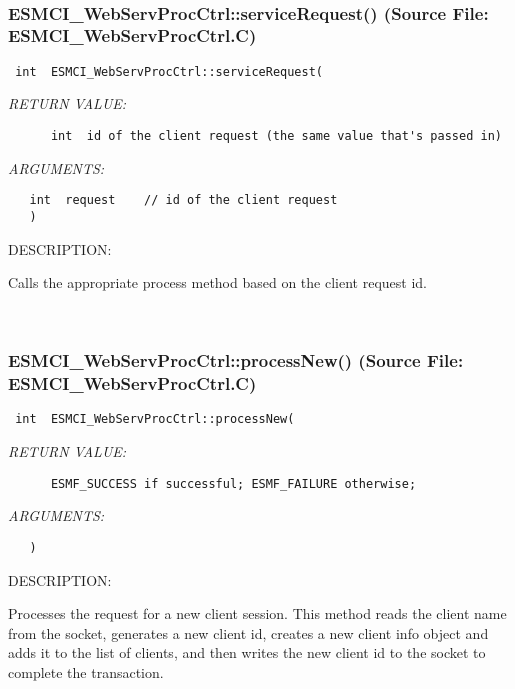  
\mbox{}\hrulefill\
 
\subsubsection{ESMCI\_WebServProcCtrl::serviceRequest() (Source File: ESMCI\_WebServProcCtrl.C)}


  
\begin{verbatim} int  ESMCI_WebServProcCtrl::serviceRequest(\end{verbatim}{\em RETURN VALUE:}
\begin{verbatim}      int  id of the client request (the same value that's passed in)\end{verbatim}{\em ARGUMENTS:}
\begin{verbatim}   int  request    // id of the client request
   )\end{verbatim}
{\sf DESCRIPTION:\\ }


      Calls the appropriate process method based on the client request id.
   
 
\mbox{}\hrulefill\
 
\subsubsection{ESMCI\_WebServProcCtrl::processNew() (Source File: ESMCI\_WebServProcCtrl.C)}


  
\begin{verbatim} int  ESMCI_WebServProcCtrl::processNew(\end{verbatim}{\em RETURN VALUE:}
\begin{verbatim}      ESMF_SUCCESS if successful; ESMF_FAILURE otherwise;\end{verbatim}{\em ARGUMENTS:}
\begin{verbatim}   )\end{verbatim}
{\sf DESCRIPTION:\\ }


      Processes the request for a new client session.  This method reads the
      client name from the socket, generates a new client id, creates a new
      client info object and adds it to the list of clients, and then writes
      the new client id to the socket to complete the transaction.
   
